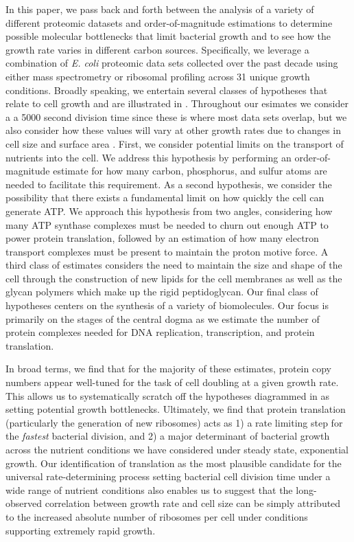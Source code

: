 In this paper, we pass back and forth between the analysis of a variety of
different proteomic datasets and order-of-magnitude estimations to determine
possible molecular bottlenecks that limit bacterial growth and to see how the
growth rate varies in different carbon sources. Specifically, we leverage a
combination of \textit{E. coli} proteomic data sets collected over the past
decade using either mass spectrometry \citep{schmidt2016, peebo2015,
valgepea2013} or ribosomal profiling \citep{li2014} across 31 unique growth
conditions. Broadly speaking, we entertain several classes of hypotheses that
relate to cell growth and are illustrated in .  Throughout our
esimates we consider a a 5000 second division time since these is where most
data sets overlap, but we also consider how these values will vary at other
growth rates due to changes in cell size and surface area
\citep{taheriaraghi2015}. First, we consider potential limits on the transport
of nutrients into the cell. We address this hypothesis by performing an
order-of-magnitude estimate for how many carbon, phosphorus, and sulfur atoms
are needed to facilitate this requirement. As a second hypothesis, we consider
the possibility that there exists a fundamental limit on how quickly the cell
can generate ATP. We approach this hypothesis from two angles, considering how
many ATP synthase complexes must be needed to churn out enough ATP to power
protein translation, followed by an estimation of how many electron transport
complexes must be present to maintain the proton motive force. A third class of
estimates considers the need to maintain the size and shape of the cell through
the construction of new lipids for the cell membranes as well as the glycan
polymers which make up the rigid peptidoglycan. Our final class of hypotheses
centers on the synthesis of a variety of biomolecules. Our focus is primarily on
the stages of the central dogma as we estimate the number of protein complexes
needed for DNA replication, transcription, and protein translation.

In broad terms, we find that for the majority of these estimates, protein copy
numbers appear well-tuned for the task of cell doubling at a given growth rate.
This allows us to systematically scratch off the hypotheses diagrammed in
 as setting potential growth bottlenecks. Ultimately, we find
that protein translation (particularly the generation of new ribosomes) acts as
1) a rate limiting step for the \textit{fastest} bacterial division, and 2) a
major determinant of bacterial growth across the nutrient conditions we have
considered under steady state, exponential growth.  Our identification of
translation as the most plausible candidate for the universal rate-determining
process setting bacterial cell division time under a wide range of nutrient
conditions also enables us to suggest that the long-observed correlation between
growth rate and cell size \citep{schaechter1958, si2017} can be simply
attributed to the increased absolute number of ribosomes per cell under
conditions supporting extremely rapid growth.

